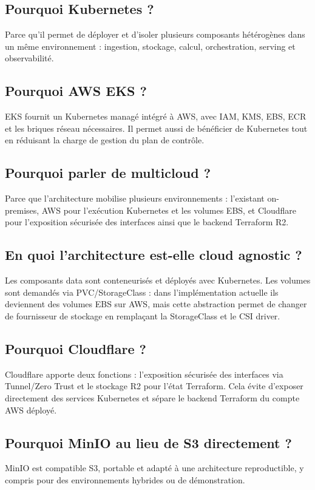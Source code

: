 \documentclass[11pt,a4paper]{article}
\begin{document}
\subsection*{Pourquoi Kubernetes ?}
Parce qu'il permet de déployer et d'isoler plusieurs composants hétérogènes dans un même environnement : ingestion, stockage, calcul, orchestration, serving et observabilité.

\subsection*{Pourquoi AWS EKS ?}
EKS fournit un Kubernetes managé intégré à AWS, avec IAM, KMS, EBS, ECR et les briques réseau nécessaires. Il permet aussi de bénéficier de Kubernetes tout en réduisant la charge de gestion du plan de contrôle.

\subsection*{Pourquoi parler de multicloud ?}
Parce que l'architecture mobilise plusieurs environnements : l'existant on-premises, AWS pour l'exécution Kubernetes et les volumes EBS, et Cloudflare pour l'exposition sécurisée des interfaces ainsi que le backend Terraform R2.

\subsection*{En quoi l'architecture est-elle cloud agnostic ?}
Les composants data sont conteneurisés et déployés avec Kubernetes. Les volumes sont demandés via PVC/StorageClass : dans l'implémentation actuelle ils deviennent des volumes EBS sur AWS, mais cette abstraction permet de changer de fournisseur de stockage en remplaçant la StorageClass et le CSI driver.

\subsection*{Pourquoi Cloudflare ?}
Cloudflare apporte deux fonctions : l'exposition sécurisée des interfaces via Tunnel/Zero Trust et le stockage R2 pour l'état Terraform. Cela évite d'exposer directement des services Kubernetes et sépare le backend Terraform du compte AWS déployé.

\subsection*{Pourquoi MinIO au lieu de S3 directement ?}
MinIO est compatible S3, portable et adapté à une architecture reproductible, y compris pour des environnements hybrides ou de démonstration.
\end{document}
